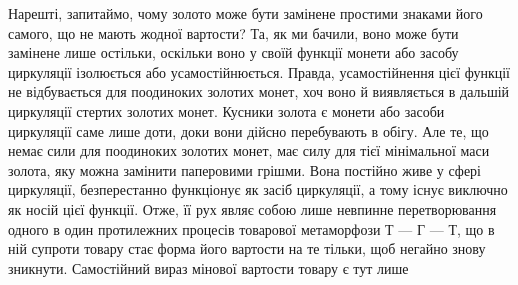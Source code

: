 Нарешті, запитаймо, чому золото може бути замінене простими
знаками його самого, що не мають жодної вартости? Та, як ми
бачили, воно може бути замінене лише остільки, оскільки воно
у своїй функції монети або засобу циркуляції ізолюється або
усамостійнюється. Правда, усамостійнення цієї функції не відбувається
для поодиноких золотих монет, хоч воно й виявляється
в дальшій циркуляції стертих золотих монет. Кусники золота
є монети або засоби циркуляції саме лише доти, доки вони дійсно
перебувають в обігу. Але те, що немає сили для поодиноких золотих
монет, має силу для тієї мінімальної маси золота, яку можна
замінити паперовими грішми. Вона постійно живе у сфері циркуляції,
безперестанно функціонує як засіб циркуляції, а тому
існує виключно як носій цієї функції. Отже, її рух являє собою
лише невпинне перетворювання одного в один протилежних процесів
товарової метаморфози Т — Г — Т, що в ній супроти товару
стає форма його вартости на те тільки, щоб негайно знову зникнути.
Самостійний вираз мінової вартости товару є тут лише
\parbreak{}  %
